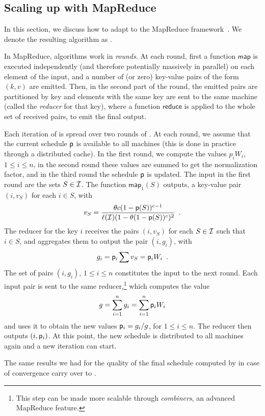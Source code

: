 \subsection{Scaling up with MapReduce}\label{sec:mapreduce}
In this section, we discuss how to adapt \algonameapx to the
MapReduce framework~\citep{dean2008mapreduce}. We denote the resulting algorithm
as \algonamemr.

In MapReduce, algorithms work in \emph{rounds}. At each round, first a function
$\mathsf{map}$ is executed independently (and therefore potentially massively in
parallel) on each element of the input, and a number of (or zero) key-value pairs
of the form $(k,v)$ are emitted. Then, in the second part of the round, the
emitted pairs are partitioned by key and elements with the same key are sent to
the same machine (called the \emph{reducer} for that key), where a function
$\mathsf{reduce}$ is applied to the whole set of received pairs, to emit the
final output.

Each iteration of \algonameapx is spread over two rounds of \algonamemr. At
each round, we assume that the current schedule $\mathsf{p}$ is available to all
machines (this is done in practice through a distributed cache). In the first
round, we compute the values $p_iW_i$, $1\le i\le n$, in the second round these
values are summed to get the normalization factor, and in the third round the
schedule $\mathsf{p}$ is updated. The input in the first round are the sets
$S\in\mathcal{I}$. The function $\mathsf{map}_1(S)$ outputs, a key-value pair
$(i,v_S)$ for each $i\in S$, with
\[
	v_S = \frac{\theta c
		(1-\mathsf{p}(S))^{c-1}}{\ell(\mathcal{I})(1-\theta(1-\mathsf{p}(S))^c)^2}\enspace.
\]
The reducer for the key $i$ receives the pairs $(i,v_S)$ for each $S\in\mathcal{I}$
such that $i\in S$, and aggregates them to output the pair $(i,g_i)$, with
\[
g_i=\mathsf{p}_i\sum v_S = \mathsf{p}_i W_i\enspace.
\]
The set of pairs $(i, g_i)$, $1\le i\le n$ constitutes the input to the
next round. Each input pair is sent to the same reducer,\footnote{This step can
	be made more scalable through \emph{combiners}, an advanced MapReduce
feature.} which computes the
value
\[
	g = \sum_{i=1}^n g_i = \sum_{i=1}^n\mathsf{p}_iW_i
\]
and uses it to obtain the new values $\mathsf{p}_i = g_i / g$, for $1\le i\le n$.
The reducer then outputs $(i,\mathsf{p}_i)$.  At this point, the new schedule is
distributed to all machines again and a new iteration can start.

The same results we had for the quality of the final schedule computed by
\algonameapx in case of convergence carry over to \algonamemr.

